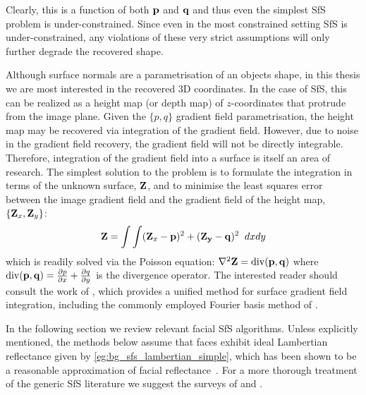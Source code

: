 Clearly, this is a function of both $\boldsymbol{\mathbf{p}}$ and $\boldsymbol{\mathbf{q}}$ and thus even
the simplest SfS problem is under-constrained. Since
even in the most constrained setting SfS is under-constrained, any violations
of these very strict assumptions will only further degrade the recovered shape.

Although surface normals
are a parametrisation of an objects shape, in this thesis we are most
interested in the recovered 3D coordinates. In the case of SfS, this can be
realized as a height map (or depth map) of $z$-coordinates that protrude
from the image plane. Given the $\{p, q\}$ gradient field parametrisation, the
height map may be recovered via integration of the gradient field. However,
due to noise in the gradient field recovery, the gradient field will not be
directly integrable. Therefore, integration of the gradient field into a
surface is itself an area of research. The simplest solution to the
problem is to formulate the integration in terms of the unknown surface,
$\boldsymbol{\mathbf{Z}}$, and to minimise the least squares error~\cite{horn1990height,simchony1990direct,agrawal2006range}
between the image gradient field and the gradient field of the height map,
$\{\boldsymbol{\mathbf{Z}}_x, \boldsymbol{\mathbf{Z}}_y\}$:
\begin{equation}\label{eq:bg_sfs_gradient_field_ls}
    \boldsymbol{\mathbf{Z}} = \int \int (\boldsymbol{\mathbf{Z}}_x - \boldsymbol{\mathbf{p}})^2 + (\boldsymbol{\mathbf{Z_y}} - \boldsymbol{\mathbf{q}})^2 \;\; dx dy
\end{equation}
which is readily solved via the Poisson equation:
$\nabla^2 \boldsymbol{\mathbf{Z}} = \operatorname{div}(\boldsymbol{\mathbf{p}}, \boldsymbol{\mathbf{q}})$ where
$\operatorname{div}(\boldsymbol{\mathbf{p}}, \boldsymbol{\mathbf{q}}) = \frac{\partial p}{\partial x} + \frac{\partial q}{\partial y}$ 
is the divergence operator. The interested reader should consult the
work of \citet{agrawal2006range}, which provides a unified method for 
surface gradient field integration, including the commonly employed Fourier
basis method of \citet{frankot1988method}.

In the following section we review relevant facial SfS algorithms. Unless
explicitly mentioned, the methods below assume that faces exhibit ideal
Lambertian reflectance given by \cref{eg:bg_sfs_lambertian_simple},
which has been shown to be a reasonable approximation
of facial reflectance~\cite{Sirovich:1987te,georghiades2001fromfew,%
Basri:2003ie,turk1991eigenfaces,Hallinan:1994dz,ramamoorthi2002analytic,%
ramamoorthi2001relationship,shashua1997photometric,moses1993face}. For a more
thorough treatment of the generic SfS literature we suggest the surveys
of \citet{zhang1999shape} and \citet{durou2008numerical}.
